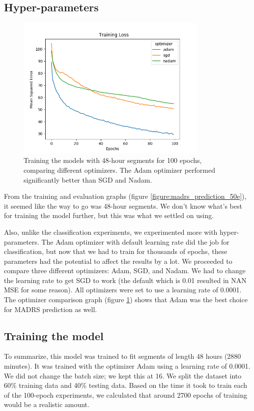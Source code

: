\subsection{Hyper-parameters}
\begin{figure}[h]
\begin{center}
      \includegraphics[height=7cm]{img/madrs_prediction/optimizers.png}
      \caption{Training the models with 48-hour segments for 100 epochs, comparing different optimizers. The Adam optimizer performed significantly better than SGD and Nadam.}
      \label{figure:madrs_prediction_optimizers}
\end{center}
\end{figure}

\noindent From the training and evaluation graphs (figure \ref{figure:madrs_prediction_50e}), it seemed like the way to go was 48-hour segments. We don't know what's best for training 
the model further, but this was what we settled on using. 

Also, unlike the classification experiments, we experimented more with hyper-parameters. The Adam optimizer with default learning rate did the job for classification, 
but now that we had to train for thousands of epochs, these parameters had the potential to affect the results by a lot. 
We proceeded to compare three different optimizers: Adam, SGD, and Nadam. We had to change the learning rate to get SGD to work 
(the default which is 0.01 \cite{keras_docs} resulted in NAN MSE for some reason). All optimizers were set to use a learning rate of 0.0001. 
The optimizer comparison graph (figure \ref{figure:madrs_prediction_optimizers}) shows that Adam was the best choice for MADRS prediction as well. 


\subsection{Training the model}
To summarize, this model was trained to fit segments of length 48 hours (2880 minutes). It was trained with the optimizer Adam using a learning rate of 0.0001. We did not change the batch size; we kept this at 16. We split the dataset into 60\% training data and 40\% testing data. Based on the time it took to train each of the 100-epoch experiments, we calculated that around 2700 epochs of training would be a realistic amount.


